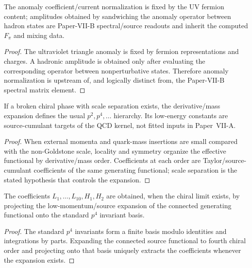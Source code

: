 \documentclass[12pt,a4paper]{article}
\begin{document}
\begin{theorem}
\label{p10:thm:anomaly-source-paper-xi-boundary}
The anomaly coefficient/current normalization is fixed by the UV fermion content; amplitudes obtained by sandwiching the anomaly operator between hadron states are Paper-VII-B spectral/source readouts and inherit the computed \(F_\pi\) and mixing data.
\end{theorem}
\begin{proof}
The ultraviolet triangle anomaly is fixed by fermion representations and charges.  A hadronic amplitude is obtained only after evaluating the corresponding operator between nonperturbative states.  Therefore anomaly normalization is upstream of, and logically distinct from, the Paper-VII-B spectral matrix element.
\end{proof}

\begin{theorem}
\label{p10:thm:native-chiral-eft-hierarchy}
If a broken chiral phase with scale separation exists, the derivative/mass expansion defines the usual \(p^2,p^4,\ldots\) hierarchy.  Its low-energy constants are source-cumulant targets of the QCD kernel, not fitted inputs in Paper~VII-A.
\end{theorem}
\begin{proof}
When external momenta and quark-mass insertions are small compared with the non-Goldstone scale, locality and symmetry organize the effective functional by derivative/mass order.  Coefficients at each order are Taylor/source-cumulant coefficients of the same generating functional; scale separation is the stated hypothesis that controls the expansion.
\end{proof}

\begin{corollary}
\label{p10:cor:nlo-chiral-constants-native-targets}
The coefficients \(L_1,\ldots,L_{10},H_1,H_2\) are obtained, when the chiral limit exists, by projecting the low-momentum/source expansion of the connected generating functional onto the standard \(p^4\) invariant basis.
\end{corollary}
\begin{proof}
The standard $p^4$ invariants form a finite basis modulo identities and integrations by parts.  Expanding the connected source functional to fourth chiral order and projecting onto that basis uniquely extracts the coefficients whenever the expansion exists.
\end{proof}
\end{document}
